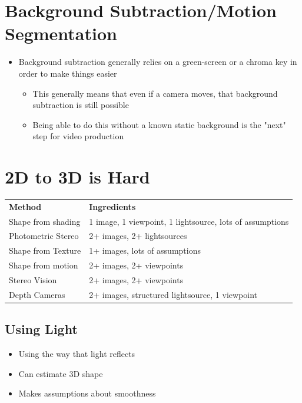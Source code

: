 \documentclass[a4paper]{article}
\begin{document}
\section{Background Subtraction/Motion Segmentation}
\label{sec-8}
\begin{itemize}
\item Background subtraction generally relies on a green-screen or a chroma key in order to make things easier
\begin{itemize}
\item This generally means that even if a camera moves, that background subtraction is still possible
\item Being able to do this without a known static background is the "next" step for video production
\end{itemize}
\end{itemize}

\section{2D to 3D is Hard}
\label{sec-9}
\begin{center}
\begin{tabular}{ll}
\hline
\textbf{Method} & \textbf{Ingredients}\\
Shape from shading & 1 image, 1 viewpoint, 1 lightsource, lots of assumptions\\
Photometric Stereo & 2+ images, 2+ lightsources\\
Shape from Texture & 1+ images, lots of assumptions\\
Shape from motion & 2+ images, 2+ viewpoints\\
Stereo Vision & 2+ images, 2+ viewpoints\\
Depth Cameras & 2+ images, structured lightsource, 1 viewpoint\\
\hline
\end{tabular}
\end{center}

\subsection{Using Light}
\label{sec-9-1}
\begin{itemize}
\item Using the way that light reflects
\item Can estimate 3D shape
\item Makes assumptions about smoothness
\end{itemize}
\end{document}
